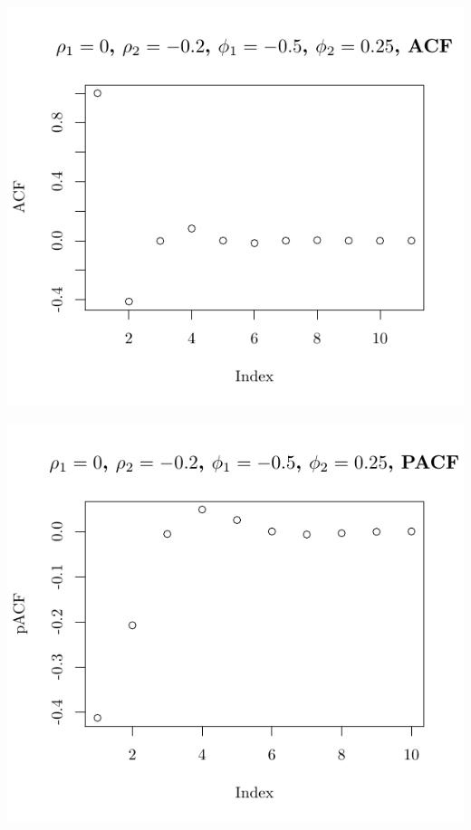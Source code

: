 \documentclass[10pt]{paper}\usepackage[]{graphicx}\usepackage[]{color}
\makeatletter
\def\maxwidth{ %
  \ifdim\Gin@nat@width>\linewidth
    \linewidth
  \else
    \Gin@nat@width
  \fi
}
\newenvironment{knitrout}{}{} %
\makeatother
\begin{document}
\begin{knitrout}
{\centering \includegraphics[width=\maxwidth]{figure/graphics-plotter-75} 

}




{\centering \includegraphics[width=\maxwidth]{figure/graphics-plotter-76} 

}





\end{knitrout}
\end{document}
